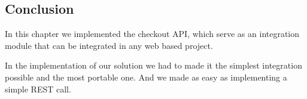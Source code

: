 \begin{spacing}{1.2}
\section*{Conclusion}
In this chapter we implemented the checkout API, which serve as an integration module that can be integrated in any web based project.

In the implementation of our solution we had to made it the simplest integration possible and the most portable one. And we made as easy as implementing a simple REST call. 

\end{spacing}
